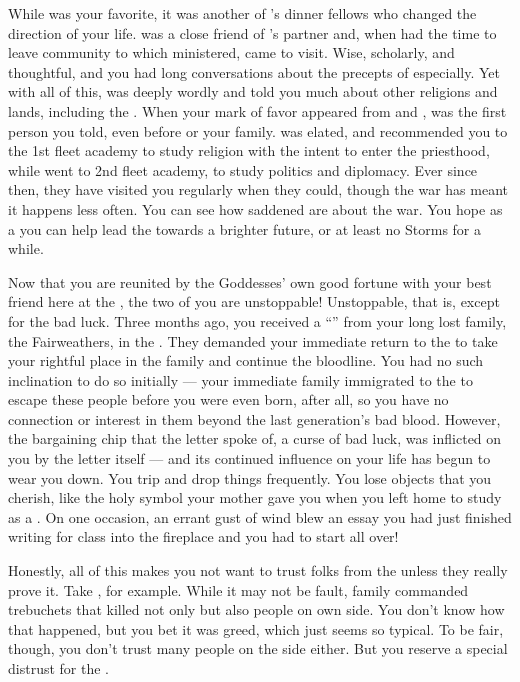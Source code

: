 \documentclass[char]{GL2020}
\begin{document}
While \cBunker{} was your favorite, it was another of \cPresident{}’s dinner fellows who changed the direction of your life. \cEbbPriest{\full} was a close friend of \cHeadDiplomat{}’s partner and, when \cEbbPriest{\they} had the time to leave \cEbbPriest{\their} community to which \cEbbPriest{\they} ministered, \cEbbPriest{\they} came to visit. Wise, scholarly, and thoughtful, \cEbbPriest{} and you had long conversations about the precepts of \cEbb{} especially. Yet with all of this, \cEbbPriest{} was deeply wordly and told you much about other religions and lands, including the \pFarm{}. When your mark of favor appeared from \cEbb{} and \cFlow{}, \cEbbPriest{} was the first person you told, even before \cPresident{} or your family. \cEbbPriest{} was elated, and recommended you to the 1st fleet academy to study religion with the intent to enter the priesthood, while \cPresident{\they} went to 2nd fleet academy, to study politics and diplomacy. Ever since then, they have visited you regularly when they could, though the war has meant it happens less often. You can see how saddened \cEbbPriest{\they} are about the war. You hope as a \cInitiate{\cleric} you can help lead the \pShippies{} towards a brighter future, or at least no Storms for a while.

Now that you are reunited by the Goddesses' own good fortune with your best friend here at the \pSchool{}, the two of you are unstoppable! Unstoppable, that is, except for the bad luck. Three months ago, you received a ``\iCursedLetter{}'' from your long lost family, the Fairweathers, in the \pFarm{}. They demanded your immediate return to the \pFarm{} to take your rightful place in the family and continue the bloodline. You had no such inclination to do so initially — your immediate family immigrated to the \pShip{} to escape these people before you were even born, after all, so you have no connection or interest in them beyond the last generation's bad blood. However, the bargaining chip that the letter spoke of, a curse of bad luck, was inflicted on you by the letter itself — and its continued influence on your life has begun to wear you down. You trip and drop things frequently. You lose objects that you cherish, like the holy symbol your mother gave you when you left home to study as a \cInitiate{\cleric}. On one occasion, an errant gust of wind blew an essay you had just finished writing for class into the fireplace and you had to start all over!

Honestly, all of this makes you not want to trust folks from the \pFarm{} unless they really prove it. Take \cLibAssist{\full}, for example. While it may not be \cLibAssist{\their} fault, \cLibAssist{\their} family commanded trebuchets that killed not only \pShippies{} but also people on \cLibAssist{\their} own side. You don’t know how that happened, but you bet it was greed, which just seems so typical. To be fair, though, you don’t trust many people on the \pTech{} side either. But you reserve a special distrust for the \pFarm{}.  
\end{document}
